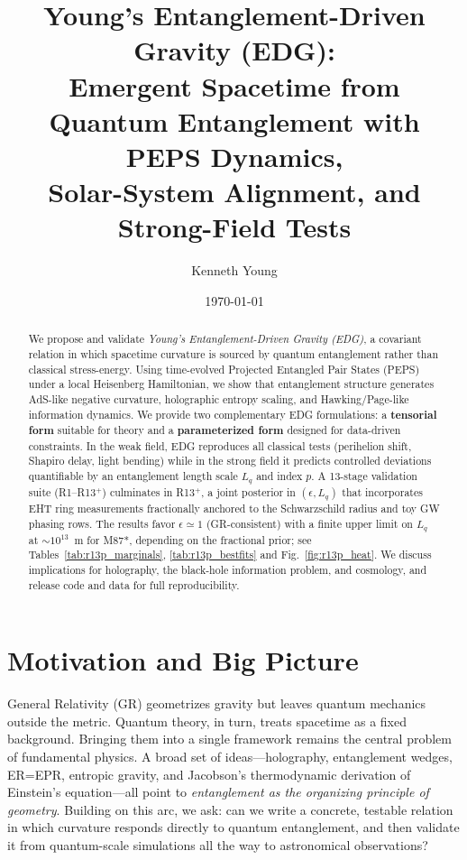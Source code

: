 \documentclass[11pt]{article}
\title{Young's Entanglement-Driven Gravity (EDG): \\
Emergent Spacetime from Quantum Entanglement with PEPS Dynamics, \\
Solar-System Alignment, and Strong-Field Tests}
\author{Kenneth Young}
\date{\today}
\begin{document}
\maketitle

\begin{abstract}
We propose and validate \emph{Young's Entanglement-Driven Gravity (EDG)}, a covariant relation in which spacetime curvature is sourced by quantum entanglement rather than classical stress-energy. Using time-evolved Projected Entangled Pair States (PEPS) under a local Heisenberg Hamiltonian, we show that entanglement structure generates AdS-like negative curvature, holographic entropy scaling, and Hawking/Page-like information dynamics. We provide two complementary EDG formulations: a \textbf{tensorial form} suitable for theory and a \textbf{parameterized form} designed for data-driven constraints. In the weak field, EDG reproduces all classical tests (perihelion shift, Shapiro delay, light bending) while in the strong field it predicts controlled deviations quantifiable by an entanglement length scale $L_q$ and index $p$. A 13-stage validation suite (R1--R13$^{+}$) culminates in R13$^{+}$, a joint posterior in $(\epsilon,L_q)$ that incorporates EHT ring measurements fractionally anchored to the Schwarzschild radius and toy GW phasing rows. The results favor $\epsilon\simeq1$ (GR-consistent) with a finite upper limit on $L_q$ at $\sim 10^{13}$~m for M87*, depending on the fractional prior; see Tables~\ref{tab:r13p_marginals}, \ref{tab:r13p_bestfits} and Fig.~\ref{fig:r13p_heat}. We discuss implications for holography, the black-hole information problem, and cosmology, and release code and data for full reproducibility.
\end{abstract}

\section{Motivation and Big Picture}
General Relativity (GR) geometrizes gravity but leaves quantum mechanics outside the metric. Quantum theory, in turn, treats spacetime as a fixed background. Bringing them into a single framework remains the central problem of fundamental physics. A broad set of ideas---holography, entanglement wedges, ER=EPR, entropic gravity, and Jacobson's thermodynamic derivation of Einstein's equation---all point to \emph{entanglement as the organizing principle of geometry}.
Building on this arc, we ask: can we write a concrete, testable relation in which curvature responds directly to quantum entanglement, and then validate it from quantum-scale simulations all the way to astronomical observations?
\end{document}
